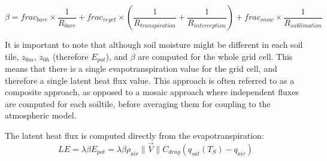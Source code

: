 \begin{equation}
    \beta = frac_{bare} \times \frac{1}{R_{bare}} + frac_{veget} \times ( \frac{1}{R_{transpiration}} + \frac{1}{R_{interception}} ) + frac_{snow} \times  \frac{1}{R_{sublimation}}
\end{equation}

It is important to note that although soil moisture might be different in each soil tile, $z_{0m}$, $z_{0h}$ (therefore $E_{pot}$), and $\beta$ are computed for the whole grid cell. This means that there is a single evapotranspiration value for the grid cell, and therefore a single latent heat flux value.
This approach is often referred to as a composite approach, as opposed to a mosaic approach where independent fluxes are computed for each soiltile, before averaging them for coupling to the atmospheric model. 




The latent heat flux is computed directly from the evapotranspiration:
\begin{equation}
    LE = \lambda \beta E_{pot} = \lambda \beta \rho_{air} \lVert \vec{V} \rVert C_{drag} (q_{sat}(T_S) - q_{air})
\end{equation}

